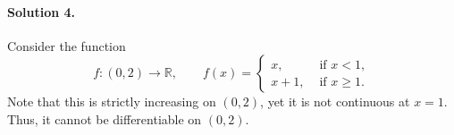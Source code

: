 \documentclass[10pt]{article}
\def\R{\mathbb{R}}
\begin{document}
    \paragraph{Solution 4.} Consider the function \[
        f\colon (0, 2) \to \R, \qquad f(x) = \begin{cases}
            x, &\text{ if } x < 1, \\
            x + 1, &\text{ if } x \geq 1.
        \end{cases}
    \] Note that this is strictly increasing on $(0, 2)$, yet it is not continuous
    at $x = 1$. Thus, it cannot be differentiable on $(0, 2)$.
    
    
     
    
\end{document}
